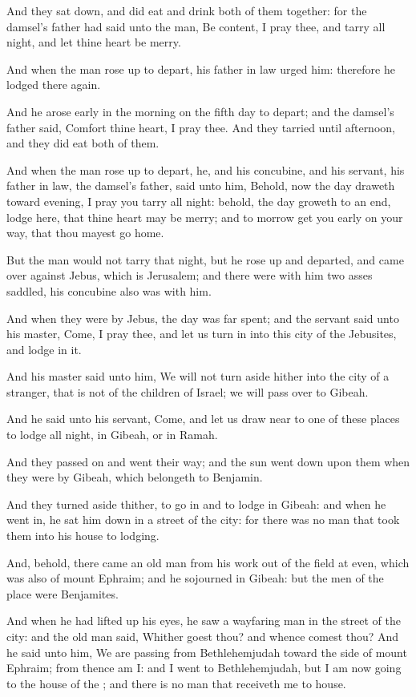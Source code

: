 \verse And they sat down, and did eat and drink both of them together: for the damsel's father had said unto the man, Be content, I pray thee, and tarry all night, and let thine heart be merry.

\verse And when the man rose up to depart, his father in law urged him: therefore he lodged there again.

\verse And he arose early in the morning on the fifth day to depart; and the damsel's father said, Comfort thine heart, I pray thee. And they tarried until afternoon, and they did eat both of them.

\verse And when the man rose up to depart, he, and his concubine, and his servant, his father in law, the damsel's father, said unto him, Behold, now the day draweth toward evening, I pray you tarry all night: behold, the day groweth to an end, lodge here, that thine heart may be merry; and to morrow get you early on your way, that thou mayest go home.

\verse But the man would not tarry that night, but he rose up and departed, and came over against Jebus, which is Jerusalem; and there were with him two asses saddled, his concubine also was with him.

\verse And when they were by Jebus, the day was far spent; and the servant said unto his master, Come, I pray thee, and let us turn in into this city of the Jebusites, and lodge in it.

\verse And his master said unto him, We will not turn aside hither into the city of a stranger, that is not of the children of Israel; we will pass over to Gibeah.

\verse And he said unto his servant, Come, and let us draw near to one of these places to lodge all night, in Gibeah, or in Ramah.

\verse And they passed on and went their way; and the sun went down upon them when they were by Gibeah, which belongeth to Benjamin.

\verse And they turned aside thither, to go in and to lodge in Gibeah: and when he went in, he sat him down in a street of the city: for there was no man that took them into his house to lodging.

\verse And, behold, there came an old man from his work out of the field at even, which was also of mount Ephraim; and he sojourned in Gibeah: but the men of the place were Benjamites.

\verse And when he had lifted up his eyes, he saw a wayfaring man in the street of the city: and the old man said, Whither goest thou? and whence comest thou?  \verse And he said unto him, We are passing from Bethlehemjudah toward the side of mount Ephraim; from thence am I: and I went to Bethlehemjudah, but I am now going to the house of the \LORD; and there is no man that receiveth me to house.

